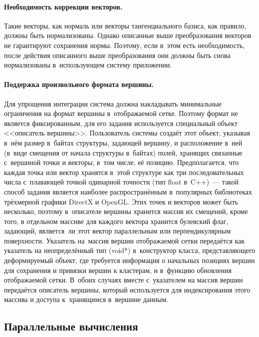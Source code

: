 \documentclass[a4paper, 14pt, titlepage]{extarticle}
\newcommand{\eng}[1]{{\English #1}}
\begin{document}
        \paragraph{Необходимость коррекции векторов.}
        Такие векторы, как нормаль или векторы тангенциального базиса, как правило, должны быть
        нормализованы. Однако описанные выше преобразования векторов не гарантируют сохранения
        нормы. Поэтому, если в~этом есть необходимость, после действия описанного выше преобразования
        они должны быть снова нормализованы в~использующем систему приложении.

        \paragraph{Поддержка произвольного формата вершины.}
        Для упрощения интеграции система должна накладывать минимальные ограничения на формат
        вершины в~отображаемой сетке. Поэтому формат не является фиксированным, для его задания
        используется специальный объект <<описатель вершины>>. Пользователь системы создаёт этот
        объект, указывая в~нём размер в~байтах структуры, задающей вершину, и расположение в~ней
        (в~виде смещения от начала структуры в~байтах) полей, хранящих связанные с~вершиной точки и
        векторы, в~том числе, её позицию.  Предполагается, что каждая точка или вектор хранятся
        в~этой структуре как три последовательных числа с~плавающей точкой одинарной точности (тип
        \eng{float} в~C++)~--- такой способ задания является наиболее распространённым в~популярных
        библиотеках трёхмерной графики \eng{DirectX} и \eng{OpenGL}. Этих точек и %
        векторов может быть несколько, поэтому в~описателе вершины хранится массив их смещений,
        кроме того, в отдельном массиве для каждого вектора хранится булевский флаг, задающий,
        является~ли этот вектор параллельным или перпендикулярным поверхности. Указатель на~массив
        вершин отображаемой сетки передаётся как указатель на неопределённый тип (void*)
        в~конструктор класса, представляющего деформируемый объект, где требуется информация о
        начальных позициях вершин для сохранения и привязки вершин к кластерам, и в~функцию
        обновления отображаемой сетки. В~обоих случаях вместе с~указателем на массив вершин
        передаётся описатель вершины, который используется для индексирования этого массива и
        доступа к~хранящимся в~вершине данным.

    \subsection{Параллельные вычисления}\label{ssec:parallel}
\end{document}
